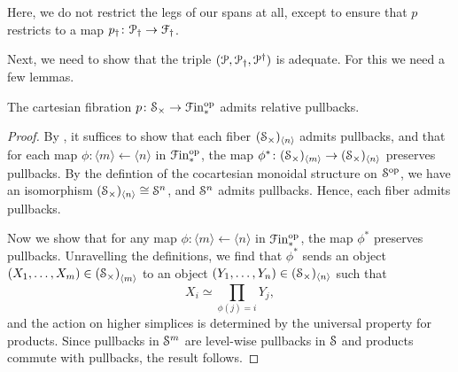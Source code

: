 \documentclass[main.tex]{subfiles}
\begin{document}
Here, we do not restrict the legs of our spans at all, except to ensure that $p$ restricts to a map $p\downdag\colon \category{P}\downdag \to \category{F}\downdag$.

Next, we need to show that the triple $\triple{P}$ is adequate. For this we need a few lemmas.

\begin{lemma}
  \label{lemma:spaces_fibration_admits_relative_pullbacks}
  The cartesian fibration $p\colon \S_{\times} \to \Finp\op$ admits relative pullbacks.
\end{lemma}
\begin{proof}
  By \cite[Cor.\ 4.3.1.11]{highertopostheory}, it suffices to show that each fiber $(\S_{\times})_{\langle n \rangle}$ admits pullbacks, and that for each map $\phi\colon \langle m \rangle \leftarrow \langle n \rangle$ in $\Finp\op$, the map $\phi^{*}\colon (\S_{\times})_{\langle m \rangle} \to (\S_{\times})_{\langle n \rangle}$ preserves pullbacks. By the defintion of the cocartesian monoidal structure on $\S\op$, we have an isomorphism  $(\S_{\times})_{\langle n \rangle} \cong \S^{n}$, and $\S^{n}$ admits pullbacks. Hence, each fiber admits pullbacks. 

  Now we show that for any map $\phi\colon \langle m \rangle \leftarrow \langle n \rangle$ in $\Finp\op$, the map $\phi^{*}$ preserves pullbacks. Unravelling the definitions, we find that $\phi^{*}$ sends an object $(X_{1}, \ldots, X_{m}) \in \left( \S_{\times} \right)_{\langle m \rangle}$ to an object $(Y_{1}, \ldots, Y_{n}) \in (\S_{\times})_{\langle n \rangle}$ such that
  \begin{equation*}
    X_{i} \simeq \prod_{\phi(j) = i} Y_{j},
  \end{equation*}
  and the action on higher simplices is determined by the universal property for products. Since pullbacks in $\S^{m}$ are level-wise pullbacks in $\S$ and products commute with pullbacks, the result follows.
\end{proof}
\end{document}
